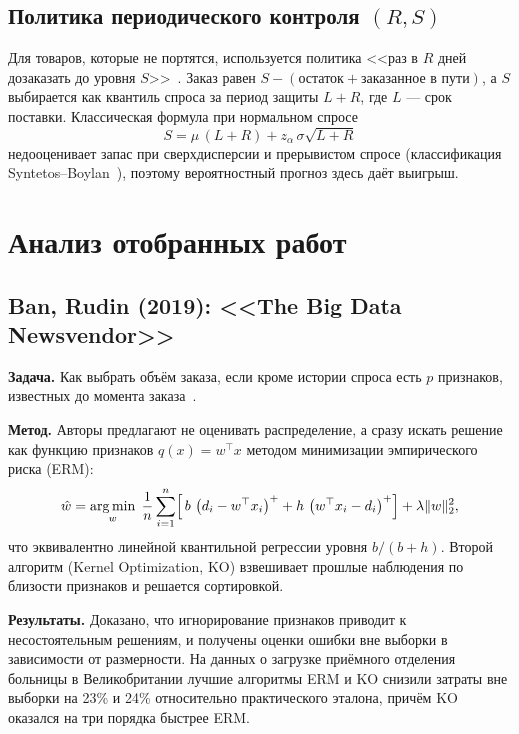 \documentclass[12pt,a4paper]{article}
\newcommand{\pos}[1]{\left(#1\right)^{+}}
\DeclareMathOperator*{\argmin}{arg\,min}
\begin{document}
\subsection{Политика периодического контроля $(R, S)$}

Для товаров, которые не портятся, используется политика
<<раз в $R$ дней дозаказать до уровня $S$>>~\cite{silver2016inventory}.
Заказ равен $S - (\text{остаток} + \text{заказанное в пути})$,
а $S$ выбирается как квантиль спроса за период защиты $L + R$,
где $L$ --- срок поставки. Классическая формула при нормальном
спросе
\begin{equation}\label{eq:ss}
  S = \mu\,(L+R) + z_\alpha\,\sigma\sqrt{L+R}
\end{equation}
недооценивает запас при сверхдисперсии и прерывистом спросе
(классификация Syntetos--Boylan~\cite{syntetos2005accuracy}),
поэтому вероятностный прогноз здесь даёт выигрыш.

\section{Анализ отобранных работ}

\subsection{Ban, Rudin (2019): <<The Big Data Newsvendor>>}

\textbf{Задача.} Как выбрать объём заказа, если кроме истории
спроса есть $p$ признаков, известных до момента заказа~\cite{ban2019bigdata}.

\textbf{Метод.} Авторы предлагают не оценивать распределение,
а сразу искать решение как функцию признаков $q(x) = w^{\top}x$
методом минимизации эмпирического риска (ERM):
\begin{equation}
  \hat w = \argmin_{w}\; \frac{1}{n}\sum_{i=1}^{n}
  \Bigl[\, b\,\pos{d_i - w^{\top}x_i} + h\,\pos{w^{\top}x_i - d_i} \Bigr]
  + \lambda \lVert w \rVert_2^2 ,
\end{equation}
что эквивалентно линейной квантильной регрессии уровня $b/(b+h)$.
Второй алгоритм (Kernel Optimization, KO) взвешивает прошлые
наблюдения по близости признаков и решается сортировкой.

\textbf{Результаты.} Доказано, что игнорирование признаков приводит
к несостоятельным решениям, и получены оценки ошибки вне выборки
в зависимости от размерности. На данных о загрузке приёмного
отделения больницы в Великобритании лучшие алгоритмы ERM и KO
снизили затраты вне выборки на 23\% и 24\% относительно практического
эталона, причём KO оказался на три порядка быстрее ERM.
\end{document}
